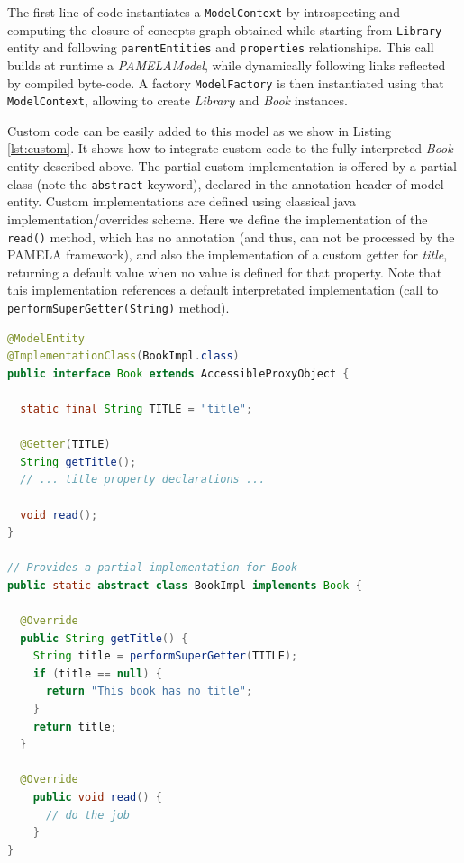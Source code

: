 The first line of code instantiates a \texttt{ModelContext} by introspecting and computing the closure of concepts graph obtained while starting from \texttt{Library} entity and following \texttt{parentEntities} and \texttt{properties} relationships. This call builds at runtime a \emph{PAMELAModel}, while dynamically following links reflected by compiled byte-code. A factory \texttt{ModelFactory} is then instantiated using that \texttt{ModelContext}, allowing to create \emph{Library} and \emph{Book} instances.

Custom code can be easily added to this model as we show in Listing \ref{lst:custom}. It shows how to integrate custom code to the fully interpreted \emph{Book} entity described above. The partial custom implementation is offered by a partial class (note the \texttt{abstract} keyword), declared in the annotation header of model entity. Custom implementations are defined using classical java implementation/overrides scheme. Here we define the implementation of the \texttt{read()} method, which has no annotation (and thus, can not be processed by the PAMELA framework), and also the implementation of a custom getter for \emph{title}, returning a default value when no value is defined for that property. Note that this implementation references a default interpretated implementation (call to \texttt{performSuperGetter(String)} method).

\begin{lstlisting}[language=Java,basicstyle=\ttfamily\footnotesize,caption=Custom Code, label=lst:custom]
@ModelEntity
@ImplementationClass(BookImpl.class)
public interface Book extends AccessibleProxyObject {

  static final String TITLE = "title";

  @Getter(TITLE)
  String getTitle();
  // ... title property declarations ...

  void read();
}

// Provides a partial implementation for Book
public static abstract class BookImpl implements Book {

  @Override
  public String getTitle() {
    String title = performSuperGetter(TITLE);
    if (title == null) {
      return "This book has no title";
    }
    return title;
  }

  @Override
    public void read() {
      // do the job
    }
}
\end{lstlisting}
